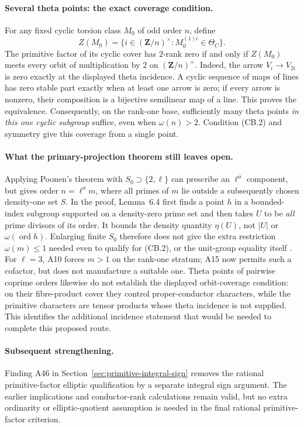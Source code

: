 \documentclass[11pt,a4paper]{article}
\begin{document}
\paragraph{Several theta points: the exact coverage condition.}
For any fixed cyclic torsion class $M_0$ of odd order $n$, define
\[
 Z(M_0)=\{i\in(\mathbf Z/n)^\times:
                    M_0^{(1)i}\in\Theta_C\}.
\]
The primitive factor of its cyclic cover has $2$-rank zero if and
only if $Z(M_0)$ meets every orbit of multiplication by $2$ on
$(\mathbf Z/n)^\times$. Indeed, the arrow $V_i\to V_{2i}$ is
zero exactly at the displayed theta incidence. A cyclic sequence
of maps of lines has zero stable part exactly when at least one
arrow is zero; if every arrow is nonzero, their composition is a
bijective semilinear map of a line. This proves the equivalence.
Consequently, on the rank-one base, sufficiently many theta points
\emph{in this one cyclic subgroup} suffice, even when $\omega(n)>2$.
Condition (CB.2) and symmetry give this coverage from a single point.

\paragraph{What the primary-projection theorem still leaves open.}
Applying Poonen's theorem with $S_0\supset\{2,\ell\}$ can prescribe
an $\ell^a$ component, but gives order $n=\ell^a m$, where all primes
of $m$ lie outside a subsequently chosen density-one set $S$.
In the proof, Lemma~6.4 first finds a point $h$ in a bounded-index
subgroup supported on a density-zero prime set and then takes
$U$ to be \emph{all} prime divisors of its order. It bounds the
density quantity $\eta(U)$, not $|U|$ or $\omega(\operatorname{ord}h)$.
Enlarging finite $S_0$ therefore does not give the extra restriction
$\omega(m)\le1$ needed even to qualify for (CB.2), or the unit-group
equality itself \cite[Theorem~1.8 and Lemmas~6.4--6.6]{Poonen2005}.
For $\ell=3$, A10 forces $m>1$ on the rank-one stratum; A15 now
permits such a cofactor, but does not manufacture a suitable one.
Theta points of pairwise coprime orders likewise do not establish
the displayed orbit-coverage condition: on their fibre-product
cover they control proper-conductor characters, while the primitive
characters are tensor products whose theta incidence is not supplied.
This identifies the additional incidence statement that would be
needed to complete this proposed route.

\paragraph{Subsequent strengthening.}
Finding A46 in Section~\ref{sec:primitive-integral-sign} removes the
rational primitive-factor elliptic qualification by a separate integral
sign argument. The earlier implications and conductor-rank calculations
remain valid, but no extra ordinarity or elliptic-quotient assumption
is needed in the final rational primitive-factor criterion.
\end{document}
